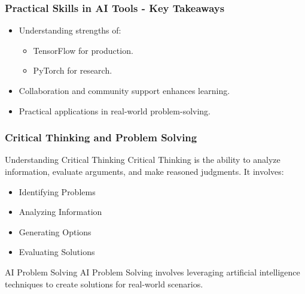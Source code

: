 \documentclass[aspectratio=169]{beamer}
\begin{document}
\begin{frame}[fragile]
    \frametitle{Practical Skills in AI Tools - Key Takeaways}
    \begin{itemize}
        \item Understanding strengths of:
        \begin{itemize}
            \item TensorFlow for production.
            \item PyTorch for research.
        \end{itemize}
        \item Collaboration and community support enhances learning.
        \item Practical applications in real-world problem-solving.
    \end{itemize}
\end{frame}

\begin{frame}[fragile]
    \frametitle{Critical Thinking and Problem Solving}
    \begin{block}{Understanding Critical Thinking}
        Critical Thinking is the ability to analyze information, evaluate arguments, and make reasoned judgments. It involves:
        \begin{itemize}
            \item Identifying Problems
            \item Analyzing Information
            \item Generating Options
            \item Evaluating Solutions
        \end{itemize}
    \end{block}
    
    \begin{block}{AI Problem Solving}
        AI Problem Solving involves leveraging artificial intelligence techniques to create solutions for real-world scenarios.
    \end{block}
\end{frame}
\end{document}
